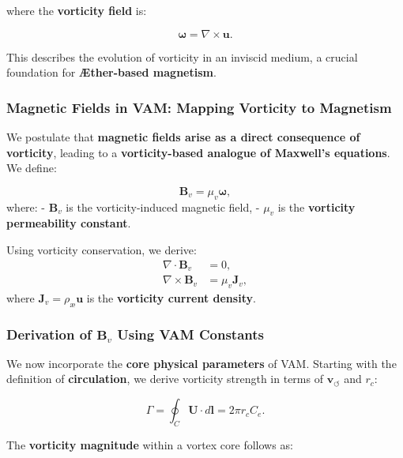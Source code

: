     where the \textbf{vorticity field} is:

    \begin{equation*}
        \boldsymbol{\omega} = \nabla \times \boldsymbol{u}.
    \end{equation*}

    This describes the evolution of vorticity in an inviscid medium, a crucial foundation for \textbf{Æther-based magnetism}.

    \subsubsection*{Magnetic Fields in VAM: Mapping Vorticity to Magnetism}
    We postulate that \textbf{magnetic fields arise as a direct consequence of vorticity}, leading to a \textbf{vorticity-based analogue of Maxwell's equations}. We define:

    \begin{equation*}
        \boldsymbol{B}_v = \mu_v \boldsymbol{\omega},
    \end{equation*}
    where:
    - \( \boldsymbol{B}_v \) is the vorticity-induced magnetic field,
    - \( \mu_v \) is the \textbf{vorticity permeability constant}.

    Using vorticity conservation, we derive:
    \begin{align}
        \nabla \cdot \boldsymbol{B}_v &= 0, \\
        \nabla \times \boldsymbol{B}_v &= \mu_v \boldsymbol{J}_v,
    \end{align}
    where \( \boldsymbol{J}_v = \rho_\text{\ae} \boldsymbol{u} \) is the \textbf{vorticity current density}.

    \subsubsection*{Derivation of \( \boldsymbol{B}_v \) Using VAM Constants}
    We now incorporate the \textbf{core physical parameters} of VAM. Starting with the definition of \textbf{circulation}, we derive vorticity strength in terms of \( \mathbf{v}_{\scriptscriptstyle\boldsymbol{\circlearrowleft}} \) and \( r_c \):

    \begin{equation*}
        \Gamma = \oint_C \mathbf{U} \cdot d\mathbf{l} = 2\pi r_c C_e.
    \end{equation*}

    The \textbf{vorticity magnitude} within a vortex core follows as:


